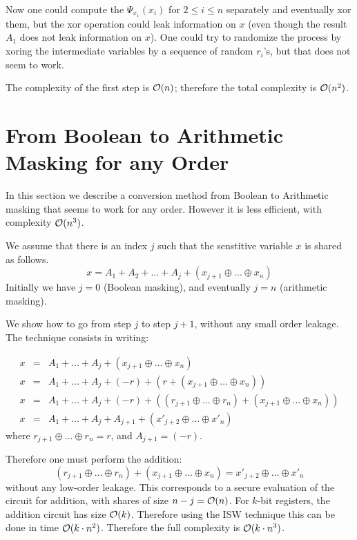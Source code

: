 \documentclass[11pt]{llncs}
\begin{document}
Now one could compute the $\Psi_{x_1}(x_i)$ for $2 \leq i \leq n$
separately and eventually xor them, but the xor operation could leak
information on $x$ (even though the result $A_1$ does not leak information
on $x$). One could try to randomize the process by xoring the
intermediate variables by a sequence of random $r_i$'s, but that does
not seem to work. 

The complexity of the first step is ${\cal O}(n)$; therefore the total
complexity is ${\cal O}(n^2)$. 

\section{From Boolean to Arithmetic Masking for any Order}

\label{s:boolarithany}

In this section we describe a conversion method from Boolean to
Arithmetic masking that seems to work for any order. However it is
less efficient, with complexity ${\cal O}(n^3)$.

We assume that there is an index $j$ such that the senstitive variable
$x$ is shared as follows.
$$ x=A_1 + A_2 + \ldots+ A_j + (x_{j+1} \oplus \ldots \oplus x_n)$$
Initially we have $j=0$ (Boolean masking), and eventually $j=n$
(arithmetic masking).

We show how to go from step $j$ to step $j+1$, without any small order
leakage. The technique consists in writing:

\begin{eqnarray*}
x & = & A_1 + \ldots +A_j + (x_{j+1} \oplus \ldots \oplus x_n)\\
x & = & A_1 + \ldots +A_j + (-r)+ \left( r + (x_{j+1} \oplus \ldots
\oplus x_n) \right) \\
x & = & A_1 + \ldots + A_{j} + (-r)+  \left( (r_{j+1} \oplus \ldots \oplus
r_n) + (x_{j+1} \oplus \ldots
\oplus x_n)   \right) \\
x & = & A_1 + \ldots + A_{j} + A_{j+1}+  \left( x'_{j+2} \oplus \ldots \oplus
x'_n \right)
\end{eqnarray*}
where $r_{j+1} \oplus \ldots \oplus r_n=r$, and $A_{j+1}=(-r)$.

Therefore one must perform the addition:
$$(r_{j+1} \oplus \ldots \oplus
r_n) + (x_{j+1} \oplus \ldots
\oplus x_n)=  x'_{j+2} \oplus \ldots \oplus
x'_n $$
without any low-order leakage. This corresponds to a secure evaluation
of the
circuit for addition, with shares of size $n-j= {\cal O}(n)$. For
$k$-bit registers, the addition circuit has size ${\cal
  O}(k)$. Therefore using the ISW technique  \cite{isw} this can be done in time ${\cal O}(k \cdot
n^2)$. Therefore the full complexity is ${\cal O}(k \cdot n^3)$.
\end{document}
